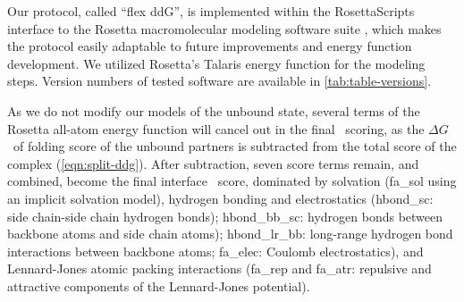 Our protocol, called ``flex ddG'', is implemented within the RosettaScripts interface to the Rosetta macromolecular modeling software suite \cite{fleishman_rosettascripts:_2011}, which makes the protocol easily adaptable to future improvements and energy function development. We utilized Rosetta's Talaris\cite{song_structure-guided_2011,shapovalov_smoothed_2011,omeara_combined_2015} energy function for the modeling steps.
Version numbers of tested software are available in \cref{tab:table-versions}.

As we do not modify our models of the unbound state, several terms of the Rosetta all-atom energy function will cancel out in the final \ddg\ scoring, as the $\Delta G$\ of folding score of the unbound partners is subtracted from the total score of the complex (\cref{eqn:split-ddg}). After subtraction, seven score terms remain, and combined, become the final interface \ddg\ score, dominated by solvation (fa\_sol using an implicit solvation model\cite{lazaridis_effective_1999}), hydrogen bonding and electrostatics\cite {kortemme_orientation-dependent_2003,song_structure-guided_2011,omeara_combined_2015} (hbond\_sc: side chain-side chain hydrogen bonds); hbond\_bb\_sc: hydrogen bonds between backbone atoms and side chain atoms); hbond\_lr\_bb: long-range hydrogen bond interactions between backbone atoms; fa\_elec: Coulomb electrostatics), and Lennard-Jones atomic packing interactions (fa\_rep and fa\_atr: repulsive and attractive components of the Lennard-Jones potential).


